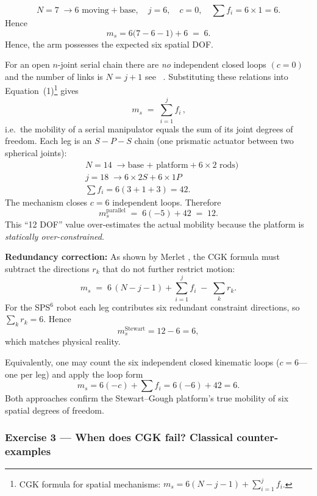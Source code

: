 \documentclass[12pt,a4paper]{article}
\begin{document}
\[
N = 7 \; \rightarrow{6\text{ moving} + \text{base}} , \quad
j = 6, \quad
c = 0,\quad
\sum f_i = 6\times 1 = 6 .
\]
Hence
\[
m_s
      = 6\bigl(7-6-1\bigr) + 6 \;=\; 6 .
\]
Hence, the arm possesses the expected six spatial DOF.

For an open \(n\)-joint serial chain there are \emph{no} independent
closed loops \((c = 0)\) and the number of links is \(N = j + 1\) see ~\cite{Craig2005}.
Substituting these relations into Equation~(1)\footnote{%
CGK formula for spatial mechanisms:
\(m_s = 6(N-j-1) + \sum_{i=1}^{j} f_i\).} gives
\[
\boxed{\,m_s \;=\;
        \sum_{i=1}^{j} f_i\,},
\]
i.e.\ the mobility of a serial manipulator equals the sum of its joint
degrees of freedom.
Each leg is an \(S\!-\!P\!-\!S\) chain (one prismatic actuator between two
spherical joints):
\begin{align*}
&N = 14\;  \rightarrow{\text{base + platform} + 6\times 2\text{ rods})} \\
&j = 18\; \rightarrow{6\times 2S + 6\times 1P} \\
&\sum f_i = 6(3+1+3) = 42 .
\end{align*}
The mechanism closes \(c=6\) independent loops.  Therefore
\[
m_s^{\text{parallel}} \;=\; 6(-5) + 42 \;=\; 12 .
\]
This “12 DOF” value over-estimates the actual mobility because the
platform is \textit{statically over-constrained}.

\textbf{Redundancy correction:}
As shown by Merlet \cite[Sec.~2.2]{Merlet2006},
the CGK formula must subtract the directions \(r_k\) that
do not further restrict motion:
\begin{equation}
m_s \;=\; 6\,(N - j - 1) + \sum_{i=1}^{j} f_i
          \;-\; \sum_{k} r_k .
\end{equation}
For the SPS\(^6\) robot each leg contributes six redundant
constraint directions, so \(\sum_k r_k = 6\).
Hence
\[
m_s^{\text{Stewart}}
  = 12 - 6
  = 6 ,
\]
which matches physical reality.

Equivalently, one may count the six independent closed kinematic loops
($c=6$—one per leg) and apply the loop form
\[
m_s = 6(-c) + \sum f_i = 6(-6) + 42 = 6 .
\]
Both approaches confirm the Stewart–Gough platform’s true mobility of
six spatial degrees of freedom.

\subsubsection*{Exercise 3 — When does CGK fail?  Classical counter-examples}
\end{document}
